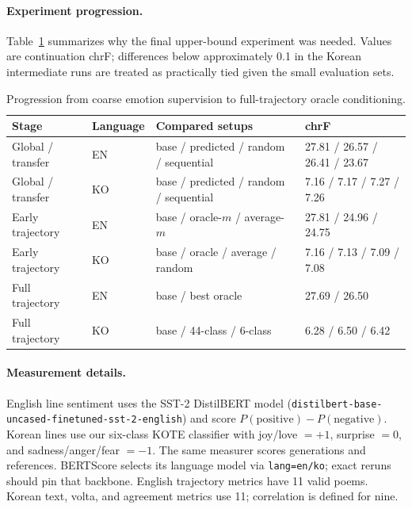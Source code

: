 \documentclass{article}
\begin{document}
\paragraph{Experiment progression.}
Table~\ref{tab:progression} summarizes why the final upper-bound experiment was needed. Values are continuation chrF; differences below approximately 0.1 in the Korean intermediate runs are treated as practically tied given the small evaluation sets.

\begin{table}[h!]
\caption{Progression from coarse emotion supervision to full-trajectory oracle conditioning.}
\label{tab:progression}
\centering
\scriptsize
\begin{tabular}{llll}
\toprule
Stage & Language & Compared setups & chrF \\
\midrule
Global / transfer & EN & base / predicted / random / sequential & 27.81 / 26.57 / 26.41 / 23.67 \\
Global / transfer & KO & base / predicted / random / sequential & 7.16 / 7.17 / 7.27 / 7.26 \\
Early trajectory & EN & base / oracle-$m$ / average-$m$ & 27.81 / 24.96 / 24.75 \\
Early trajectory & KO & base / oracle / average / random & 7.16 / 7.13 / 7.09 / 7.08 \\
Full trajectory & EN & base / best oracle & 27.69 / 26.50 \\
Full trajectory & KO & base / 44-class / 6-class & 6.28 / 6.50 / 6.42 \\
\bottomrule
\end{tabular}
\end{table}

\paragraph{Measurement details.}
English line sentiment uses the SST-2 DistilBERT model (\nolinkurl{distilbert-base-uncased-finetuned-sst-2-english}) and score $P(\text{positive})-P(\text{negative})$. Korean lines use our six-class KOTE classifier with joy/love $=+1$, surprise $=0$, and sadness/anger/fear $=-1$. The same measurer scores generations and references. BERTScore selects its language model via \texttt{lang=en/ko}; exact reruns should pin that backbone. English trajectory metrics have 11 valid poems. Korean text, volta, and agreement metrics use 11; correlation is defined for nine.
\end{document}
